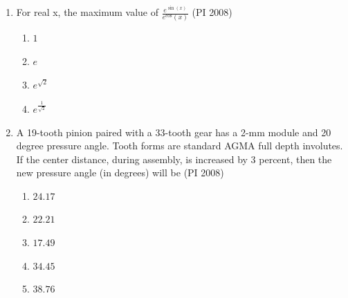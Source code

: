 \documentclass[journal,12pt,onecolumn]{IEEEtran}
\theoremstyle{remark}
\begin{document}
\begin{enumerate}
\begin{multicols}{4}
\begin{enumerate}
        \item $\myvec{
            0 & 1 & 0 \\
            1 & 0 & 0 \\
            0 & 0 & 1} 
        $
        \item $\myvec
            {0 & 1 & 0 \\
            1 & 0 & 0 \\
            0 & 0 & 1} 
        $
        \item $\myvec
           { 0 & 1 & 0 \\
            1 & 0 & 0 \\
            0 & 0 & 1} 
        $
    \end{enumerate}
\end{multicols}
\vspace{1cm}

 \item %
 For real x, the maximum value of $\frac{e^{\sin (x)}}{e^{\cos}(x)}$
    \hfill{(PI 2008)}
    \begin{multicols}{4}
    \begin{enumerate}
        \item $1$
        \item $e$
        \item $e^{\sqrt{2}}$
        \item $e^{\frac{1}{\sqrt 2}}$
    \end{enumerate}
\end{multicols}
\vspace{1cm}
 \item %
 A 19-tooth pinion paired with a 33-tooth gear has a 2-mm module and 20 degree pressure angle. Tooth forms are standard AGMA full depth involutes. If the center distance, during assembly, is increased by 3 percent, then the new pressure angle (in degrees) will be   
    \hfill{(PI 2008)}
    \begin{multicols}{4}
    \begin{enumerate}
        \item 
    $24.17$
        \item $22.21$
        \item $17.49$
        \item $34.45$
        \item $38.76$
    \end{enumerate}
\end{multicols}
\vspace{1cm}


\end{enumerate}
\end{document}
